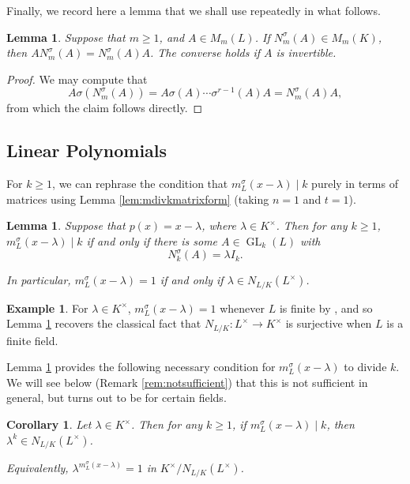 \documentclass[10pt, reqno, hidelinks]{amsart}
\DeclareMathOperator{\GL}{GL}
\numberwithin{thm}{subsection}
\newtheorem{lemma}[thm]{Lemma}
\newtheorem{cor}[thm]{Corollary}
\theoremstyle{definition}
\newtheorem{eg}[thm]{Example}
\begin{document}
Finally, we record here a lemma that we shall use repeatedly in what follows.

\begin{lemma}\label{lem:commlemma}
	Suppose that $m \geq 1$, and $A \in M_m(L)$. If $N_m^{\sigma}(A) \in M_m(K)$, then $A N_m^{\sigma}(A) = N_m^{\sigma}(A) A$. The converse holds if $A$ is invertible.
\end{lemma}

\begin{proof}
	We may compute that
	\[
	A \sigma(N_m^{\sigma}(A)) = A \sigma(A) \cdots \sigma^{r-1}(A) A = N_m^{\sigma}(A)  A,
	\]
	from which the claim follows directly.
\end{proof}

\subsection{Linear Polynomials}\label{sect:linearcase}

For $k \geq 1$, we can rephrase the condition that $m_L^{\sigma}(x-\lambda) \mid k$ purely in terms of matrices using Lemma \ref{lem:mdivkmatrixform} (taking $n = 1$ and $t = 1$).

\begin{lemma}\label{lem:linearmatrixform}
    Suppose that $p(x) = x - \lambda$, where $\lambda \in K^{\times}$. Then for any $k \geq 1$, $m_L^{\sigma}(x-\lambda) \mid k$ if and only if there is some $A \in \GL_k(L)$ with 
    \[
    N_{k}^{\sigma}(A) = \lambda I_k.
    \]
    
    In particular, $m_L^{\sigma}(x - \lambda) = 1$ if and only if $\lambda \in N_{L/K}(L^{\times})$.
\end{lemma}

\begin{eg}
	For $\lambda \in K^{\times}$, $m_L^{\sigma}(x-\lambda) = 1$ whenever $L$ is finite by \cite[Cor.\ 9.4]{TAYSchur}, and so Lemma \ref{lem:linearmatrixform} recovers the classical fact that $N_{L/K} \colon L^{\times} \rightarrow K^{\times}$ is surjective when $L$ is a finite field.
\end{eg}

Lemma \ref{lem:linearmatrixform} provides the following necessary condition for $m_L^{\sigma}(x-\lambda)$ to divide $k$. We will see below (Remark \ref{rem:notsufficient}) that this is not sufficient in general, but turns out to be for certain fields.

\begin{cor}\label{cor:neccondition}
    Let $\lambda \in K^{\times}$. Then for any $k \geq 1$, if $m_L^{\sigma}(x-\lambda) \mid k$, then $\lambda^k \in N_{L/K}(L^{\times})$.
    
    Equivalently, $\lambda^{m_L^{\sigma}(x-\lambda)} = 1$ in $K^{\times} / N_{L/K}(L^{\times})$.
\end{cor}
\end{document}
